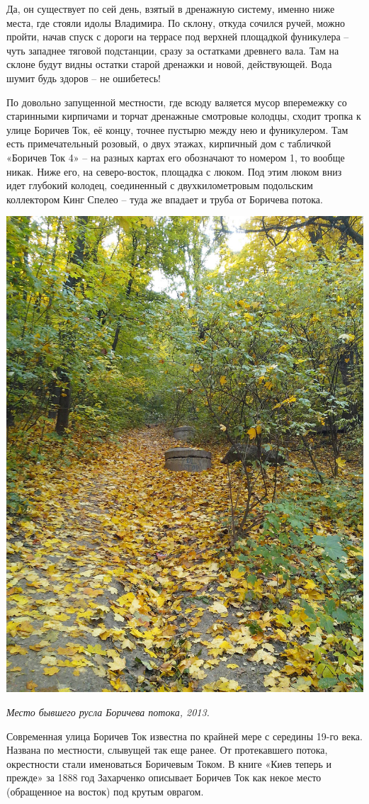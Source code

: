 Да, он существует по сей день, взятый в дренажную систему, именно ниже места, где стояли идолы Владимира. По склону, откуда сочился ручей, можно пройти, начав спуск с дороги на террасе под верхней площадкой фуникулера – чуть западнее тяговой подстанции, сразу за остатками древнего вала. Там на склоне будут видны остатки старой дренажки и новой, действующей. Вода шумит будь здоров – не ошибетесь!

По довольно запущенной местности, где всюду валяется мусор вперемежку со старинными кирпичами и торчат дренажные смотровые колодцы, сходит тропка к улице Боричев Ток, её концу, точнее пустырю между нею и фуникулером. Там есть примечательный розовый, о двух этажах, кирпичный дом с табличкой «Боричев Ток 4» – на разных картах его обозначают то номером 1, то вообще никак. Ниже его, на северо-восток, площадка с люком. Под этим люком вниз идет глубокий колодец, соединенный с двухкилометровым подольским коллектором Кинг Спелео – туда же впадает и труба от Боричева потока.

\begin{center}
\includegraphics[width=0.70\linewidth]{chast-colebanie-osnov/borichev-tok/s_borichev-IMG_20131013_150232.jpg}

\textit{Место бывшего русла Боричева потока, 2013.}
\end{center}

Современная улица Боричев Ток известна по крайней мере с середины 19-го века. Названа по местности, слывущей так еще ранее. От протекавшего потока, окрестности стали именоваться Боричевым Током. В книге «Киев теперь и прежде» за 1888 год Захарченко описывает Боричев Ток как некое место (обращенное на восток) под крутым оврагом.


